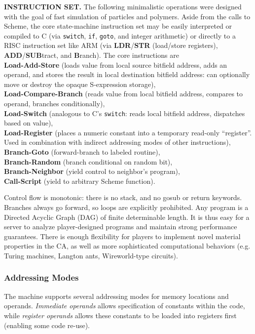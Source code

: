 \documentclass{acm_proc_article-sp}
\begin{document}
{\bf INSTRUCTION SET.}
The following minimalistic operations were designed with the goal of fast simulation of particles and polymers.
Aside from the calls to Scheme, the core state-machine instruction set may be easily interpreted or compiled to C (via {\tt switch}, {\tt if}, {\tt goto}, and integer arithmetic)
or directly to a RISC instruction set like ARM\cite{seal00} (via {\bf LDR}/{\bf STR} (load/store registers), {\bf ADD}/{\bf SUB}tract, and {\bf B}ranch).
The core instructions are
\\
{\bf Load-Add-Store} (loads value from local source bitfield address, adds an operand, and stores the result in local destination bitfield address: can optionally move or destroy the opaque S-expression storage),
\\
{\bf Load-Compare-Branch} (reads value from local bitfield address, compares to operand, branches conditionally),
\\
{\bf Load-Switch} (analogous to C's {\tt switch}: reads local bitfield address, dispatches based on value),
\\
{\bf Load-Register} (places a numeric constant into a temporary read-only ``register''. Used in combination with indirect addressing modes of other instructions),
\\
{\bf Branch-Goto} (forward-branch to labeled routine),
\\
{\bf Branch-Random} (branch conditional on random bit),
\\
{\bf Branch-Neighbor} (yield control to neighbor's program),
\\
{\bf Call-Script} (yield to arbitrary Scheme function).

Control flow is monotonic: there is no stack, and no gosub or return keywords.
Branches always go forward, so loops are explicitly prohibited.
Any program is a Directed Acyclic Graph (DAG) of finite determinable length.
It is thus easy for a server to analyze player-designed programs and maintain strong performance guarantees.
There is enough flexibility for players to implement novel material properties in the CA,
as well as more sophisticated computational behaviors (e.g. Turing machines, Langton ants, Wireworld-type circuits).

\subsubsection{Addressing Modes}

The machine supports several addressing modes for memory locations and operands.
{\em Immediate operands} allows specification of constants within the code,
while {\em register operands} allows these constants to be loaded into registers first (enabling some code re-use).
\end{document}
